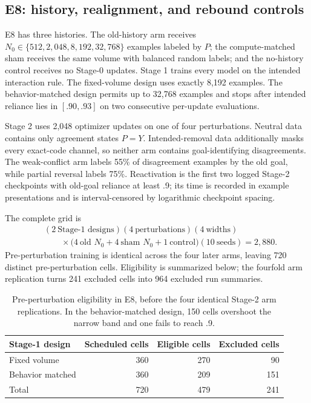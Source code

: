 \documentclass[11pt,a4paper]{article}
\begin{document}
\subsection{E8: history, realignment, and rebound controls}

E8 has three histories. The old-history arm receives $N_0\in\{512,2{,}048,8{,}192,32{,}768\}$ examples labeled by $P$; the compute-matched sham receives the same volume with balanced random labels; and the no-history control receives no Stage-0 updates. Stage 1 trains every model on the intended interaction rule. The fixed-volume design uses exactly 8,192 examples. The behavior-matched design permits up to 32,768 examples and stops after intended reliance lies in $[.90,.93]$ on two consecutive per-update evaluations.

Stage 2 uses 2,048 optimizer updates on one of four perturbations. Neutral data contains only agreement states $P=Y$. Intended-removal data additionally masks every exact-code channel, so neither arm contains goal-identifying disagreements. The weak-conflict arm labels 55\% of disagreement examples by the old goal, while partial reversal labels 75\%. Reactivation is the first two logged Stage-2 checkpoints with old-goal reliance at least .9; its time is recorded in example presentations and is interval-censored by logarithmic checkpoint spacing.

The complete grid is
\[
\begin{aligned}
&(2\ \text{Stage-1 designs})(4\ \text{perturbations})(4\ \text{widths})\\
&\qquad\times
\bigl(4\ \text{old }N_0+4\ \text{sham }N_0+1\ \text{control}\bigr)
(10\ \text{seeds})=2{,}880.
\end{aligned}
\]
Pre-perturbation training is identical across the four later arms, leaving 720 distinct pre-perturbation cells. Eligibility is summarized below; the fourfold arm replication turns 241 excluded cells into 964 excluded run summaries.

\begin{table}[h]
\centering
\begin{tabular}{lrrr}
\toprule
Stage-1 design & Scheduled cells & Eligible cells & Excluded cells \\
\midrule
Fixed volume & 360 & 270 & 90 \\
Behavior matched & 360 & 209 & 151 \\
\midrule
Total & 720 & 479 & 241 \\
\bottomrule
\end{tabular}
\caption{Pre-perturbation eligibility in E8, before the four identical Stage-2 arm replications. In the behavior-matched design, 150 cells overshoot the narrow band and one fails to reach .9.}
\label{tab:e8eligibility}
\end{table}
\end{document}
